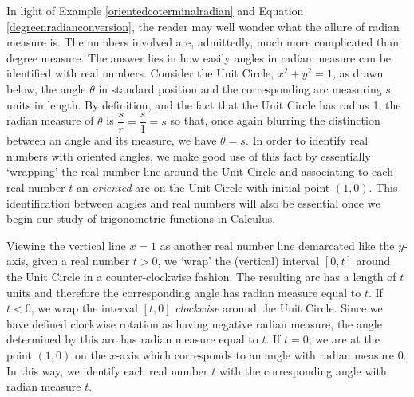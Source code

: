 
\bigskip

In light of Example \ref{orientedcoterminalradian} and Equation \ref{degreenradianconversion}, the reader may well wonder what the allure of radian measure is.  The numbers involved are, admittedly, much more complicated than degree measure.  The answer lies in how easily angles in radian measure can be identified with real numbers.   Consider the Unit Circle, $x^2 + y^2 = 1$, as drawn below, the angle $\theta$ in standard position and the corresponding arc measuring $s$ units in length.  By definition, and the fact that the Unit Circle has radius 1, the radian measure of $\theta$ is $\dfrac{s}{r}=\dfrac{s}{1} = s$ so that, once again blurring the distinction between an angle and its measure, we have $\theta = s$.  In order to identify real numbers with oriented angles, we make good use of this fact by essentially  `wrapping'  the real number line around the Unit Circle and associating to each real number $t$ an \textit{oriented} arc  on the Unit Circle with initial point $(1,0)$.  This identification between angles and real numbers will also be essential once we begin our study of trigonometric functions in Calculus. 

Viewing the vertical line $x=1$ as another real number line demarcated like the $y$-axis, given a real number $t>0$, we `wrap' the (vertical) interval $[0,t]$ around the Unit Circle in a counter-clockwise fashion.  The resulting arc has a length of $t$ units and therefore the corresponding angle has radian measure equal to $t$.  If $t<0$, we wrap the interval $[t,0]$ \textit{clockwise} around the Unit Circle.  Since we have defined clockwise rotation as having negative radian measure, the angle determined by this arc has radian measure equal to $t$.    If $t=0$, we are at the point $(1,0)$ on the $x$-axis which corresponds to an angle with radian measure $0$.  In this way, we identify each real number $t$ with the corresponding angle with radian measure $t$.



